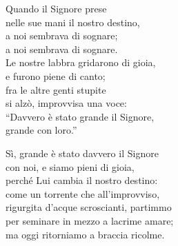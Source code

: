 
\strofa Quando il Signore prese\\
nelle sue mani il nostro destino,\\
a noi sembrava di sognare;\\
a noi sembrava di sognare.\\
Le nostre labbra gridarono di gioia,\\
e furono piene di canto;\\
fra le altre genti stupite\\
si alzò, improvvisa una voce:\\
``Davvero è stato grande il Signore,\\
grande con loro.''

\spazio
	

\spazio

\strofa Sì, grande è stato davvero il Signore\\
con noi, e siamo pieni di gioia,\\
perché Lui cambia il nostro destino:\\
come un torrente che all'improvviso,\\
rigurgita d'acque scroscianti, partimmo\\
per seminare in mezzo a lacrime amare;\\
ma oggi ritorniamo a braccia ricolme.

\spazio

